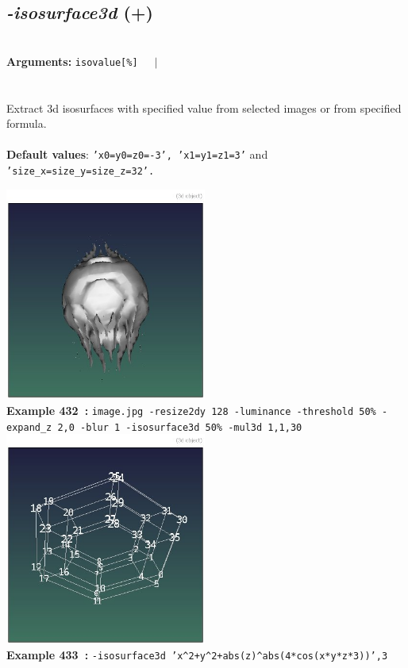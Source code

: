 \documentclass[a4paper,11pt,twoside]{book}
\begin{document}
\subsection{\emph{-isosurface3d} (+)}\vspace*{-0.5em}
~\\\textbf{Arguments: } 
{\small \texttt{isovalue[\%]}}~~~$|$\\
\\~\\
Extract 3d isosurfaces with specified value from selected images or from specified formula.
~\\~\\\textbf{Default values}: {\small \texttt{'x0=y0=z0=-3', 'x1=y1=z1=3'} and \texttt{'size\_x=size\_y=size\_z=32'.}}
\begin{center}\includegraphics[keepaspectratio=true,height=7cm,width=\textwidth]{img/gmic_def432.jpg}\\
{\footnotesize \textbf{Example 432~:} \texttt{image.jpg -resize2dy 128 -luminance -threshold 50\% -expand\_z 2,0 -blur 1 -isosurface3d 50\% -mul3d 1,1,30}}
\\\includegraphics[keepaspectratio=true,height=7cm,width=\textwidth]{img/gmic_def433.jpg}\\
{\footnotesize \textbf{Example 433~:} \texttt{-isosurface3d 'x\textasciicircum 2+y\textasciicircum 2+abs(z)\textasciicircum abs(4*cos(x*y*z*3))',3}}
\end{center}
\end{document}
